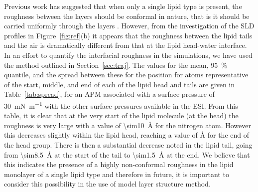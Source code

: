 \documentclass[amsmath,amssymb,twocolumn,superscriptaddress]{revtex4-1}
\begin{document}
Previous work has suggested that when only a single lipid type is present, the roughness between the layers should be conformal in nature, that is it should be carried uniformly through the layers \cite{kozhevnikov_general_2012,campbell_structure_2018}.
However, from the investigation of the SLD profiles in Figure~\ref{fig:ref}(b) it appears that the roughness between the lipid tails and the air is dramatically different from that at the lipid head-water interface.
In an effort to quantify the interfacial roughness in the simulations, we have used the method outlined in Section~\ref{sec:traj}.
The values for the mean, \SI{95}{\percent} quantile, and the spread between these for the position for atoms representative of the start, middle, and end of each of the lipid head and tails are given in Table~\ref{tab:spread}, for an APM associated with a surface pressure of \SI{30}{\milli\newton\per\meter} with the other surface pressures available in the ESI.
From this table, it is clear that at the very start of the lipid molecule (at the head) the roughness is very large with a value of \SI{\sim10}{\angstrom} for the nitrogen atom.
However this decreases slightly within the lipid head, reaching a value of \si{\angstrom} for the end of the head group.
There is then a substantial decrease noted in the lipid tail, going from \SI{\sim8.5}{\angstrom} at the start of the tail to \SI{\sim1.5}{\angstrom} at the end.
We believe that this indicates the presence of a highly non-conformal roughness in the lipid monolayer of a single lipid type and therefore in future, it is important to consider this possibility in the use of model layer structure method.
%
\end{document}

